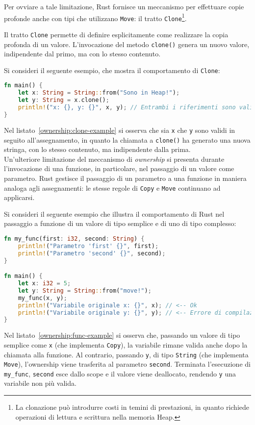 Per ovviare a tale limitazione, Rust fornisce un meccanismo per effettuare copie profonde anche con tipi che utilizzano \texttt{Move}: il tratto \texttt{Clone}\footnote{La clonazione può introdurre costi in temini di prestazioni, in quanto richiede operazioni di lettura e scrittura nella memoria Heap.}.

Il tratto \texttt{Clone} permette di definire esplicitamente come realizzare la copia profonda di un valore. L'invocazione del metodo \texttt{clone()} genera un nuovo valore, indipendente dal primo, ma con lo stesso contenuto.

Si consideri il seguente esempio, che mostra il comportamento di \texttt{Clone}:\hfill
\begin{lstlisting}[language=Rust, caption={Comportamento di Clone}, label={ownership:clone-example}]
fn main() {
    let x: String = String::from("Sono in Heap!");
    let y: String = x.clone();
    println!("x: {}, y: {}", x, y); // Entrambi i riferimenti sono validi
}
\end{lstlisting}
Nel listato~\ref{ownership:clone-example} si osserva che sia \texttt{x} che \texttt{y} sono validi in seguito all'assegnamento, in quanto la chiamata a \texttt{clone()} ha generato una nuova stringa, con lo stesso contenuto, ma indipendente dalla prima. \hfill
\vspace{10pt}\\
\noindent Un'ulteriore limitazione del meccanismo di \textit{ownership} si presenta durante l'invocazione di una funzione, in particolare, nel passaggio di un valore come parametro.
Rust gestisce il passaggio di un parametro a una funzione in maniera analoga agli assegnamenti: le stesse regole di \texttt{Copy} e \texttt{Move} continuano ad applicarsi.

Si consideri il seguente esempio che illustra il comportamento di Rust nel passaggio a funzione di un valore di tipo semplice e di uno di tipo complesso:
\begin{lstlisting}[language=Rust, caption={Trasferimento di ownership nelle chiamate a funzione}, label={ownership:func-example}]
fn my_func(first: i32, second: String) {
    println!("Parametro 'first' {}", first);
    println!("Parametro 'second' {}", second);
}

fn main() {
    let x: i32 = 5;
    let y: String = String::from("move!");
    my_func(x, y);
    println!("Variabile originale x: {}", x); // <-- Ok
    println!("Variabile originale y: {}", y); // <-- Errore di compilazione: ownership trasferita
}
\end{lstlisting}
Nel listato~\ref{ownership:func-example} si osserva che, passando un valore di tipo semplice come \texttt{x} (che implementa \texttt{Copy}), la variabile rimane valida anche dopo la chiamata alla funzione. Al contrario, passando \texttt{y}, di tipo \texttt{String} (che implementa \texttt{Move}), l'ownership viene trasferita al parametro \texttt{second}. Terminata l'esecuzione di \texttt{my\_func}, \texttt{second} esce dallo scope e il valore viene deallocato, rendendo \texttt{y} una variabile non più valida.

